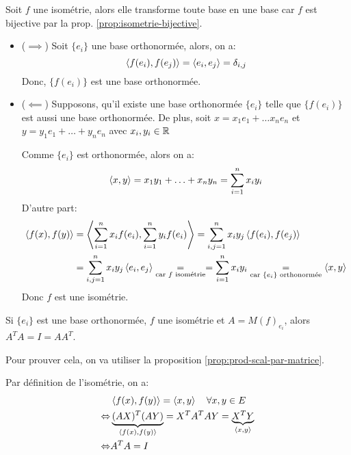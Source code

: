 \begin{preuve}
    Soit $f$ une isométrie, alors elle transforme toute base en une base car  $f$ est bijective par la prop. \ref{prop:isometrie-bijective}. 
    \begin{itemize}
        \item ($\implies$) Soit $\{e_i\}$ une base orthonormée, alors, on a:
             \[
                 \left\langle f(e_i), f(e_j) \right\rangle = \left\langle e_i, e_j \right\rangle = \delta_{i,j}
            \] 
            Donc, $\{f(e_i)\}$ est une base orthonormée.
        \item ($\impliedby$) Supposons, qu'il existe une base orthonormée $\{e_i\}$ telle que  $\{f(e_i)\}$ est aussi une base orthonormée. De plus, soit  $x = x_1e_1 + \ldots x_ne_n$ et $y = y_1e_1 + \ldots + y_ne_n$ avec $x_i, y_i \in \mathbb{R}$
            \par
            Comme $\{e_i\}$ est orthonormée, alors on a:
             \[
                 \left\langle x, y \right\rangle = x_1y_1 + \ldots + x_ny_n = \sum_{i=1}^{n} x_iy_i
            \] 
            D'autre part:
            \begin{align*}
                \left\langle f(x), f(y) \right\rangle &= \left\langle \sum_{i=1}^{n} x_if(e_i), \sum_{i=1}^{n} y_if(e_i) \right\rangle = \sum_{i,j = 1}^{n} x_iy_j\left\langle f(e_i), f(e_j) \right\rangle\\
                                     &= \sum_{i,j=1}^{n} x_iy_j\left\langle e_i, e_j \right\rangle \underset{\text{car } f \text{ isométrie}}{=} = \sum_{i=1}^{n} x_iy_i \underset{\text{car } \{e_i\} \text{ orthonormée}} = \left\langle x, y \right\rangle
            \end{align*}
            Donc $f$ est une isométrie.
    \end{itemize}
\end{preuve}
\begin{prop}
    Si $\{e_i\}$ est une base orthonormée, $f$ une isométrie et  $A = M(f)_{e_i}$, alors  $A^{T}A = I = AA^{T}$.
\end{prop}
\begin{preuve}
    Pour prouver cela, on va utiliser la proposition \ref{prop:prod-scal-par-matrice}. 
    \par
    Par définition de l'isométrie, on a:
    \begin{align*}
        &\left\langle f(x), f(y) \right\rangle = \left\langle x, y \right\rangle \quad \forall x, y \in E\\
        \Leftrightarrow &\underbrace{ (AX)^{T}(AY) }_{\left\langle f(x), f(y) \right\rangle} = X^TA^TAY = \underbrace{X^TY}_{\left\langle x, y \right\rangle}\\
        \Leftrightarrow &A^TA = I
    \end{align*}
\end{preuve}
